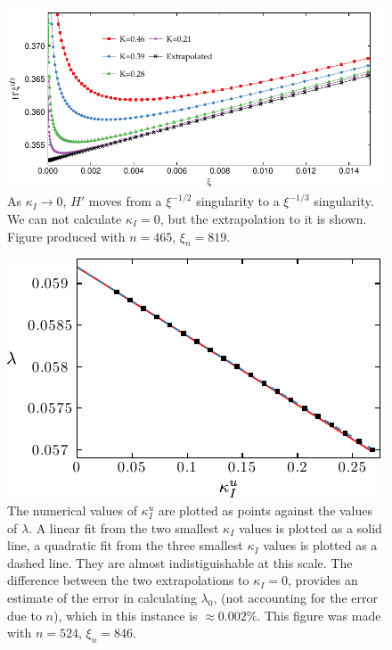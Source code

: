 \documentclass{jfm}
\begin{document}
\begin{figure}
  \centerline{\includegraphics{./../../Graphs/hprime-x.pdf}}
  \caption{As $\kappa_I\to 0$, $H'$ moves from a $\xi^{-1/2}$ singularity
           to a $\xi^{-1/3}$ singularity. We can not calculate $\kappa_I=0$, 
           but the extrapolation to it is shown. Figure produced with $n=465$,
           $\xi_n = 819$.}
\end{figure}
\begin{figure}
  \centerline{\includegraphics{./../../Graphs/l0-edited.pdf}}
  \caption{The numerical values of $\kappa_I^u$ are plotted as points against
           the values of $\lambda$. A linear fit from the two smallest $\kappa_I$ 
           values is plotted 
           as a solid line, a quadratic fit from the three smallest $\kappa_I$ 
           values is plotted as a dashed line.
           They are almost indistiguishable at this scale. 
           The difference between the two extrapolations to $\kappa_I=0$,  
           provides an estimate of the error in calculating $\lambda_0$, 
           (not accounting for the error due to $n$), which in this instance is 
           $\approx 0.002\%$. This figure was made with $n=524$, $\xi_n=846$. }
\end{figure}
\end{document}
